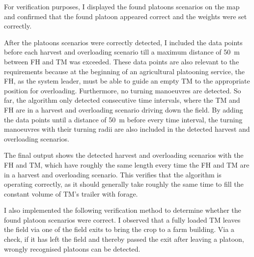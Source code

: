 For verification purposes, I displayed the found platoons scenarios on the map
and confirmed that the found platoon appeared correct and the weights were set correctly.

After the platoons scenarios were correctly detected, I included the data points before each harvest and overloading scenario
till a maximum distance of \SI{50}{\metre} between \ac{FH} and \ac{TM} was exceeded.
These data points are also relevant to the requirements because at the beginning of an agricultural platooning service,
the \ac{FH}, as the system leader, must be able to guide an empty \ac{TM} to the appropriate position for overloading.
Furthermore, no turning manoeuvres are detected.
So far, the algorithm only detected consecutive time intervals, where the
\ac{TM} and \ac{FH} are in a harvest and overloading scenario driving down the field.
By adding the data points until a distance
of \SI{50}{\metre} before every time interval, the turning manoeuvres with their turning radii are also included in the detected
harvest and overloading scenarios.

The final output shows the detected harvest and overloading scenarios with the \ac{FH} and \ac{TM}, which have roughly the same
length every time the \ac{FH} and \ac{TM} are in a harvest and overloading scenario.
This verifies that the algorithm is operating correctly,
as it should generally take roughly the same time to fill the constant volume of \ac{TM}'s trailer with forage.

I also implemented the following verification method to determine whether the found platoon scenarios were correct.
I observed that a fully loaded \ac{TM} leaves the field via one of the field exits to bring the crop to a farm building.
Via a check, if it has left the field and thereby passed the exit after leaving a platoon, wrongly recognised
platoons can be detected.

